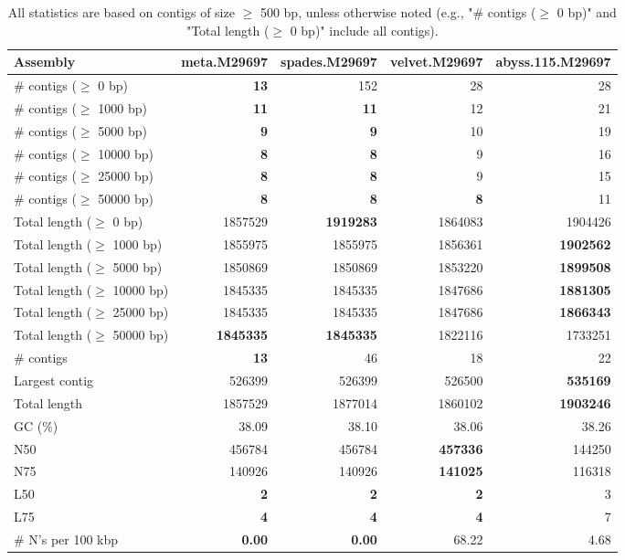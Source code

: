 \documentclass[12pt,a4paper]{article}
\begin{document}
\begin{table}[ht]
\begin{center}
\caption{All statistics are based on contigs of size $\geq$ 500 bp, unless otherwise noted (e.g., "\# contigs ($\geq$ 0 bp)" and "Total length ($\geq$ 0 bp)" include all contigs).}
\begin{tabular}{|l*{4}{|r}|}
\hline
Assembly & meta.M29697 & spades.M29697 & velvet.M29697 & abyss.115.M29697 \\ \hline
\# contigs ($\geq$ 0 bp) & {\bf 13} & 152 & 28 & 28 \\ \hline
\# contigs ($\geq$ 1000 bp) & {\bf 11} & {\bf 11} & 12 & 21 \\ \hline
\# contigs ($\geq$ 5000 bp) & {\bf 9} & {\bf 9} & 10 & 19 \\ \hline
\# contigs ($\geq$ 10000 bp) & {\bf 8} & {\bf 8} & 9 & 16 \\ \hline
\# contigs ($\geq$ 25000 bp) & {\bf 8} & {\bf 8} & 9 & 15 \\ \hline
\# contigs ($\geq$ 50000 bp) & {\bf 8} & {\bf 8} & {\bf 8} & 11 \\ \hline
Total length ($\geq$ 0 bp) & 1857529 & {\bf 1919283} & 1864083 & 1904426 \\ \hline
Total length ($\geq$ 1000 bp) & 1855975 & 1855975 & 1856361 & {\bf 1902562} \\ \hline
Total length ($\geq$ 5000 bp) & 1850869 & 1850869 & 1853220 & {\bf 1899508} \\ \hline
Total length ($\geq$ 10000 bp) & 1845335 & 1845335 & 1847686 & {\bf 1881305} \\ \hline
Total length ($\geq$ 25000 bp) & 1845335 & 1845335 & 1847686 & {\bf 1866343} \\ \hline
Total length ($\geq$ 50000 bp) & {\bf 1845335} & {\bf 1845335} & 1822116 & 1733251 \\ \hline
\# contigs & {\bf 13} & 46 & 18 & 22 \\ \hline
Largest contig & 526399 & 526399 & 526500 & {\bf 535169} \\ \hline
Total length & 1857529 & 1877014 & 1860102 & {\bf 1903246} \\ \hline
GC (\%) & 38.09 & 38.10 & 38.06 & 38.26 \\ \hline
N50 & 456784 & 456784 & {\bf 457336} & 144250 \\ \hline
N75 & 140926 & 140926 & {\bf 141025} & 116318 \\ \hline
L50 & {\bf 2} & {\bf 2} & {\bf 2} & 3 \\ \hline
L75 & {\bf 4} & {\bf 4} & {\bf 4} & 7 \\ \hline
\# N's per 100 kbp & {\bf 0.00} & {\bf 0.00} & 68.22 & 4.68 \\ \hline
\end{tabular}
\end{center}
\end{table}
\end{document}
